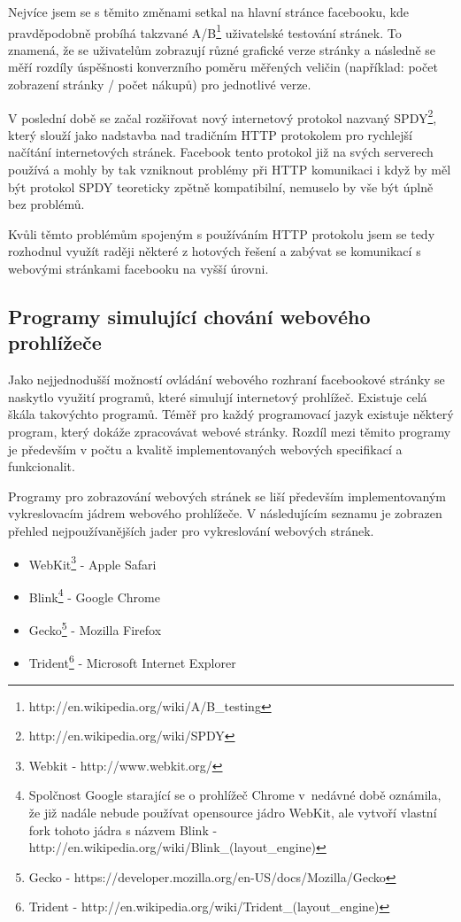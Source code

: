 \documentclass[thesis=M,czech]{FITthesis}[2013/05/10]
\begin{document}
Nejvíce jsem se s těmito změnami setkal na hlavní stránce facebooku, kde pravděpodobně probíhá takzvané A/B\footnote{http://en.wikipedia.org/wiki/A/B\_testing} uživatelské testování stránek. To znamená, že se uživatelům zobrazují různé grafické verze stránky a následně se měří rozdíly úspěšnosti konverzního poměru měřených veličin (například: počet zobrazení stránky / počet nákupů) pro jednotlivé verze.

V poslední době se začal rozšiřovat nový internetový protokol nazvaný SPDY\footnote{http://en.wikipedia.org/wiki/SPDY}, který slouží jako nadstavba nad tradičním HTTP protokolem pro rychlejší načítání internetových stránek. Facebook tento protokol již na svých serverech používá a mohly by tak vzniknout problémy při HTTP komunikaci i když by měl být protokol SPDY teoreticky zpětně kompatibilní, nemuselo by vše být úplně bez problémů.

Kvůli těmto problémům spojeným s používáním HTTP protokolu jsem se tedy rozhodnul využít raději některé z hotových řešení a zabývat se komunikací s webovými stránkami facebooku na vyšší úrovni. 

\subsection{Programy simulující chování webového prohlížeče}

Jako nejjednodušší možností ovládání webového rozhraní facebookové stránky se naskytlo využití programů, které simulují internetový prohlížeč. Existuje celá škála takovýchto programů. Téměř pro každý programovací jazyk existuje některý program, který dokáže zpracovávat webové stránky. Rozdíl mezi těmito programy je především v počtu a kvalitě implementovaných webových specifikací a funkcionalit.

Programy pro zobrazování webových stránek se liší především implementovaným vykreslovacím jádrem webového prohlížeče. V následujícím seznamu je zobrazen přehled nejpoužívanějších jader pro vykreslování webových stránek.

\begin{itemize}
  \item WebKit\footnote{Webkit - http://www.webkit.org/} - Apple Safari
  \item Blink\footnote{Spolčnost Google starající se o prohlížeč Chrome v~nedávné době oznámila, že již nadále nebude používat opensource jádro WebKit, ale vytvoří vlastní fork tohoto jádra s názvem Blink -  http://en.wikipedia.org/wiki/Blink\_(layout\_engine)} - Google Chrome
  \item Gecko\footnote{Gecko - https://developer.mozilla.org/en-US/docs/Mozilla/Gecko} - Mozilla Firefox
  \item Trident\footnote{Trident - http://en.wikipedia.org/wiki/Trident\_(layout\_engine)} - Microsoft Internet Explorer
\end{itemize}
 
\end{document}
